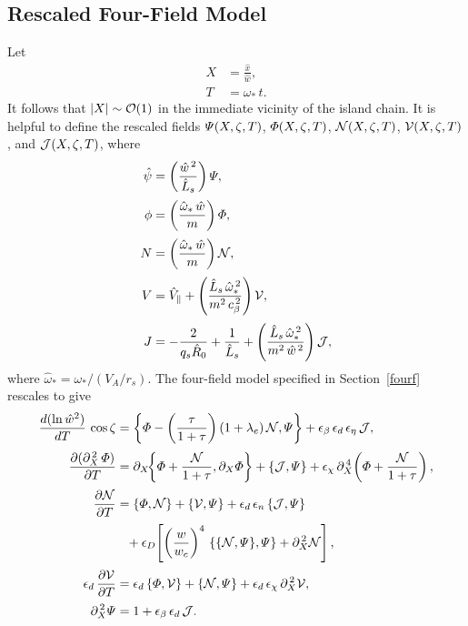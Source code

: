 \documentclass[notitlepage,12pt]{article}
\begin{document}
\subsection{Rescaled Four-Field Model}\label{s8.2}
Let
\begin{align}
X &= \frac{\hat{x}}{\hat{w}},\\[0.5ex]
T &= \omega_\ast\,t.
\end{align}
It follows that $|X|\sim {\cal O}(1)$ in the immediate vicinity of the island chain. It is helpful to define the
rescaled fields ${\mit\Psi}(X,\zeta,T)$, ${\mit\Phi}(X,\zeta,T)$, ${\cal N}(X,\zeta,T)$,
${\cal V}(X,\zeta,T)$, and ${\cal J}(X,\zeta,T)$, where
\begin{align}
\hat{\psi} &= \left(\frac{\hat{w}^{\,2}}{\hat{L}_s}\right){\mit\Psi},\label{e466}\\[0.5ex]
\phi &=\left(\frac{\hat{\omega}_\ast\,\hat{w}}{m}\right){\mit\Phi},\\[0.5ex]
N &= \left(\frac{\hat{\omega}_\ast\,\hat{w}}{m}\right){\cal N},\\[0.5ex]
V&= \hat{V}_\parallel + \left(\frac{\hat{L}_s\,\hat{\omega}_\ast^{\,2}}{m^2\,c_\beta^{\,2}}\right){\cal V},\\[0.5ex]
J & =-\frac{2}{q_s \hat{R}_0} + \frac{1}{\hat{L}_s} + \left(\frac{\hat{L}_s\,\hat{\omega}_\ast^{\,2}}{m^2\,\hat{w}^{\,2}}\right){\cal J},
\end{align}
where $\hat{\omega}_\ast = \omega_\ast/(V_A/r_s)$. 
The four-field model specified in Section~\ref{fourf} rescales to give
\begin{align}\label{e469}
\frac{d(\ln \hat{w}^2)}{dT}\,\cos\zeta &= \left\{{\mit\Phi}-\left(\frac{\tau}{1+\tau}\right)(1+\lambda_e)\,{\cal N}, {\mit\Psi}\right\}
+ \epsilon_\beta\,\epsilon_d\,\epsilon_\eta\,{\cal J},\\[0.5ex]
\frac{\partial(\partial_X^{\,2}\,{\mit\Phi})}{\partial T} &= \partial_X\!\!\left\{{\mit\Phi} + \frac{{\cal N}}{1+\tau},\partial_X{\mit\Phi}\right\}
+ \{{\cal J},{\mit\Psi}\}+ \epsilon_\chi \,\partial_X^{\,4}\!\left({\mit\Phi} + \frac{{\cal N}}{1+\tau}\right),\label{e470}\\[0.5ex]
\frac{\partial {\cal N}}{\partial T} &= \{{\mit\Phi}, {\cal N}\} + \{{\cal V},{\mit\Psi}\} + \epsilon_d\,\epsilon_n\,\{{\cal J},{\mit\Psi}\}\nonumber\\[0.5ex]&\phantom{=}
+ \epsilon_D \!\left[\left(\frac{w}{w_c}\right)^4\,\{\{{\cal N},{\mit\Psi}\}, {\mit\Psi}\}+\partial_X^{\,2}{\cal N}\right],\label{e471}\\[0.5ex]
\epsilon_d\,\frac{\partial {\cal V}}{\partial T} &= \epsilon_d\,\{{\mit\Phi},{\cal V}\}+\{{\cal N}, {\mit\Psi}\} + \epsilon_d\,\epsilon_\chi\,\partial_X^{\,2} {\cal V},\label{e472}\\[0.5ex]
\partial_X^{\,2}{\mit\Psi} &= 1+ \epsilon_\beta\,\epsilon_d\,{\cal J}.\label{e473}
\end{align}
\end{document}
